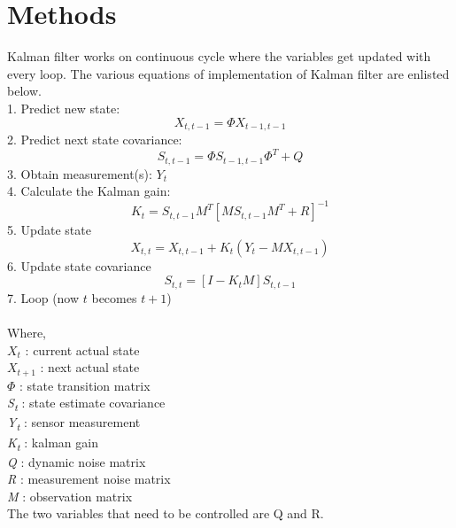 \documentclass[12pt]{article}
\begin{document}
\section{Methods}
Kalman filter works on continuous cycle where the variables get updated with every loop. The various equations of implementation of Kalman filter are enlisted below.\\
1. Predict new state:
\begin{equation}
X_{t,t-1} = \Phi X_{t-1,t-1}
\end{equation}
2. Predict next state covariance:
\begin{equation}
S_{t,t-1} = \Phi S_{t-1,t-1}\Phi^T + Q
\end{equation}
3. Obtain measurement(s): $Y_t$\\
4. Calculate the Kalman gain:
\begin{equation}
K_t = S_{t, t-1}M^T[MS_{t,t-1}M^T+R]^{-1}
\end{equation}
5. Update state
\begin{equation}
X_{t,t} = X_{t,t-1}+K_t(Y_t-MX_{t,t-1})
\end{equation}
6. Update state covariance
\begin{equation}
S_{t,t} = [I - K_tM]S_{t,t-1}
\end{equation}
7. Loop (now $t$ becomes $t+1$)\\
\\
Where,\\
$X_t$ : current actual state\\
$X_{t+1}$ : next actual state\\
$\Phi$ : state transition matrix\\
\textit{S\textsubscript{t}} : state estimate covariance\\
\textit{Y\textsubscript{t}} : sensor measurement\\
\textit{K\textsubscript{t}} : kalman gain\\
\textit{Q} : dynamic noise matrix\\
\textit{R} : measurement noise matrix\\
\textit{M} : observation matrix\\
The two variables that need to be controlled are Q and R.\\
\end{document}

